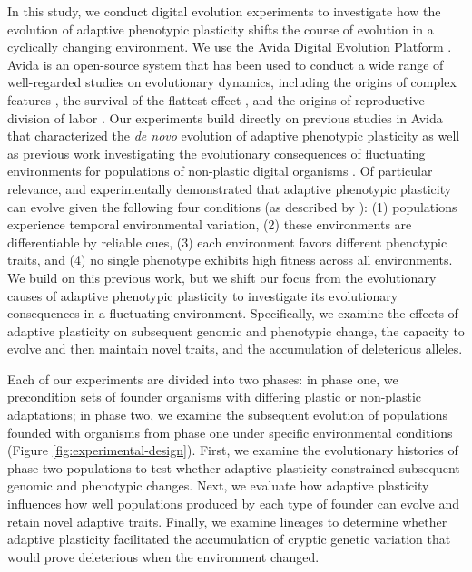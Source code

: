 \begin{raggedbottom}
In this study, we conduct digital evolution experiments to investigate how the evolution of adaptive phenotypic plasticity shifts the course of evolution in a cyclically changing environment.
We use the Avida Digital Evolution Platform \citep{ofria_avida:_2009}.
Avida is an open-source system that has been used to conduct a wide range of well-regarded studies on evolutionary dynamics, including
the origins of complex features \citep{lenski_evolutionary_2003},
the survival of the flattest effect \citep{wilke_evolution_2001},
and the origins of reproductive division of labor \citep{goldsby_evolutionary_2014}.
Our experiments build directly on previous studies in Avida that characterized the \textit{de novo} evolution of adaptive phenotypic plasticity \citep{clune_investigating_2007,lalejini_evolutionary_2016} as well as previous work investigating the evolutionary consequences of fluctuating environments for populations of non-plastic digital organisms \citep{li_digital_2004,canino-koning_fluctuating_2019}.
Of particular relevance, \cite{clune_investigating_2007} and \cite{lalejini_evolutionary_2016} experimentally demonstrated that adaptive phenotypic plasticity can evolve given the following four conditions (as described by \citealt{ghalambor_behavior_2010}):
(1) populations experience temporal environmental variation,
(2) these environments are differentiable by reliable cues,
(3) each environment favors different phenotypic traits,
and (4) no single phenotype exhibits high fitness across all environments.
We build on this previous work, but we shift our focus from the evolutionary causes of adaptive phenotypic plasticity to investigate its evolutionary consequences in a fluctuating environment.
Specifically, we examine the effects of adaptive plasticity on subsequent genomic and phenotypic change, the capacity to evolve and then maintain novel traits, and the accumulation of deleterious alleles.

Each of our experiments are divided into two phases: in phase one, we precondition sets of founder organisms with differing plastic or non-plastic adaptations;
in phase two, we examine the subsequent evolution of populations founded with organisms from phase one under specific environmental conditions (Figure \ref{fig:experimental-design}).
First, we examine the evolutionary histories of phase two populations to test whether adaptive plasticity constrained subsequent genomic and phenotypic changes.
Next, we evaluate how adaptive plasticity influences how well populations produced by each type of founder can evolve and retain novel adaptive traits.
Finally, we examine lineages to determine whether adaptive plasticity facilitated the accumulation of cryptic genetic variation that would prove deleterious when the environment changed.


\end{raggedbottom}
